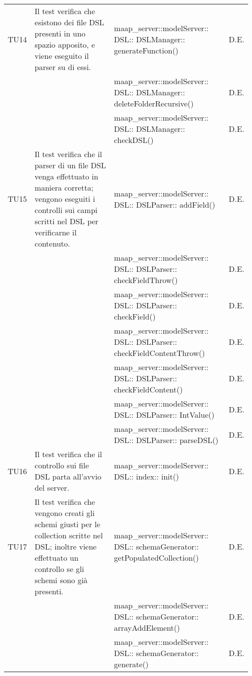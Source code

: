 \begin{center}
\begin{longtable}{|p{1cm}|p{5cm}|p{6cm}|p{1cm}|}
\midrule
TU14
& Il test verifica che esistono dei file DSL presenti in uno spazio apposito, e viene eseguito il parser su di essi.
&  maap\_server::modelServer:: DSL:: DSLManager:: generateFunction()
& D.E.\\
& & maap\_server::modelServer:: DSL:: DSLManager:: deleteFolderRecursive()
& D.E.\\
& & maap\_server::modelServer:: DSL:: DSLManager:: checkDSL()
& D.E.\\

\midrule
TU15
& Il test verifica che il parser di un file DSL venga effettuato in maniera corretta; vengono eseguiti i controlli sui campi scritti nel DSL per verificarne il contenuto.
&  maap\_server::modelServer:: DSL:: DSLParser:: addField()
& D.E.\\
& & maap\_server::modelServer:: DSL:: DSLParser:: checkFieldThrow()
& D.E.\\
& & maap\_server::modelServer:: DSL:: DSLParser:: checkField()
& D.E.\\
& & maap\_server::modelServer:: DSL:: DSLParser:: checkFieldContentThrow()
& D.E.\\
& & maap\_server::modelServer:: DSL:: DSLParser:: checkFieldContent()
& D.E.\\
& & maap\_server::modelServer:: DSL:: DSLParser:: IntValue()
& D.E.\\
& & maap\_server::modelServer:: DSL:: DSLParser:: parseDSL()
& D.E.\\

\midrule
TU16
& Il test verifica che il controllo sui file DSL parta all'avvio del server.
&  maap\_server::modelServer:: DSL:: index:: init()
& D.E.\\

\midrule
TU17
& Il test verifica che vengono creati gli schemi giusti per le collection scritte nel DSL; inoltre viene effettuato un controllo se gli schemi sono già presenti.
&  maap\_server::modelServer:: DSL:: schemaGenerator:: getPopulatedCollection()
& D.E.\\
& & maap\_server::modelServer:: DSL:: schemaGenerator:: arrayAddElement()
& D.E.\\
& & maap\_server::modelServer:: DSL:: schemaGenerator:: generate()
& D.E.\\






\end{longtable}
\end{center}
